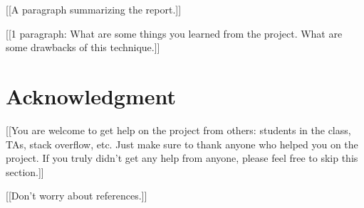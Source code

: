 \documentclass[12pt]{article}%
\begin{document}
{\color{red}[[A paragraph summarizing the report.]]}


{\color{red}[[1 paragraph:  What are some things you learned from the project.  What are some drawbacks of this technique.]]}


\section*{Acknowledgment}

{\color{red}[[You are welcome to get help on the project from others:  students in the class, TAs, stack overflow, etc.  Just make sure to thank anyone who helped you on the project.  If you truly didn't get any help from anyone, please feel free to skip this section.]]}


\bigskip
\bigskip
\bigskip

{\color{red}[[Don't worry about references.]]}
\end{document}
